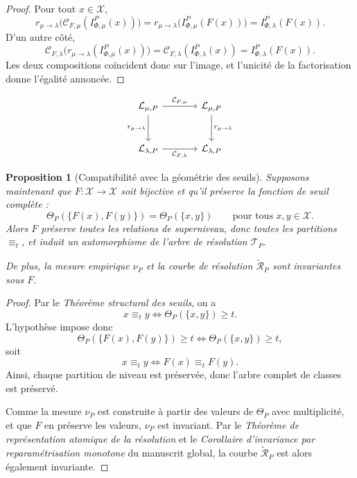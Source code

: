\documentclass[11pt,a4paper,openany]{book}
\newtheorem{proposition}[definition]{Proposition}
\begin{document}
\begin{proof}
Pour tout \(x\in\mathcal X\),
\[
r_{\mu\to\lambda}\bigl(\mathcal C_{F,\mu}(I_{\Phi,\mu}^P(x))\bigr)
=
r_{\mu\to\lambda}\bigl(I_{\Phi,\mu}^P(F(x))\bigr)
=
I_{\Phi,\lambda}^P(F(x)).
\]
D'un autre côté,
\[
\mathcal C_{F,\lambda}\bigl(r_{\mu\to\lambda}(I_{\Phi,\mu}^P(x))\bigr)
=
\mathcal C_{F,\lambda}(I_{\Phi,\lambda}^P(x))
=
I_{\Phi,\lambda}^P(F(x)).
\]
Les deux compositions coïncident donc sur l'image, et l'unicité de la factorisation donne l'égalité annoncée.
\end{proof}

\begin{center}
\[
\begin{tikzcd}[column sep=large,row sep=large]
\mathcal L_{\mu,P} \arrow[r,"\mathcal C_{F,\mu}"] \arrow[d,"r_{\mu\to\lambda}"'] &
\mathcal L_{\mu,P} \arrow[d,"r_{\mu\to\lambda}"] \\
\mathcal L_{\lambda,P} \arrow[r,"\mathcal C_{F,\lambda}"'] &
\mathcal L_{\lambda,P}
\end{tikzcd}
\]
\end{center}

\begin{proposition}[Compatibilité avec la géométrie des seuils]
\label{prop:seuils-calcul}
Supposons maintenant que \(F:\mathcal X\to\mathcal X\) soit bijective et qu'il préserve la fonction de seuil complète :
\[
\Theta_P(\{F(x),F(y)\})=\Theta_P(\{x,y\})
\qquad\text{pour tous }x,y\in\mathcal X.
\]
Alors \(F\) préserve toutes les relations de superniveau, donc toutes les partitions \(\equiv_t\), et induit un automorphisme de l'arbre de résolution \(\mathcal T_P\).

De plus, la mesure empirique \(\nu_P\) et la courbe de résolution \(\widetilde{\mathcal R}_P\) sont invariantes sous \(F\).
\end{proposition}

\begin{proof}
Par le \emph{Théorème structural des seuils}, on a
\[
x\equiv_t y
\Longleftrightarrow
\Theta_P(\{x,y\})\ge t.
\]
L'hypothèse impose donc
\[
\Theta_P(\{F(x),F(y)\})\ge t
\Longleftrightarrow
\Theta_P(\{x,y\})\ge t,
\]
soit
\[
x\equiv_t y \Longleftrightarrow F(x)\equiv_t F(y).
\]
Ainsi, chaque partition de niveau est préservée, donc l'arbre complet de classes est préservé.

Comme la mesure \(\nu_P\) est construite à partir des valeurs de \(\Theta_P\) avec multiplicité, et que \(F\) en préserve les valeurs, \(\nu_P\) est invariant. Par le \emph{Théorème de représentation atomique de la résolution} et le \emph{Corollaire d'invariance par reparamétrisation monotone} du manuscrit global, la courbe \(\widetilde{\mathcal R}_P\) est alors également invariante.
\end{proof}
\end{document}
